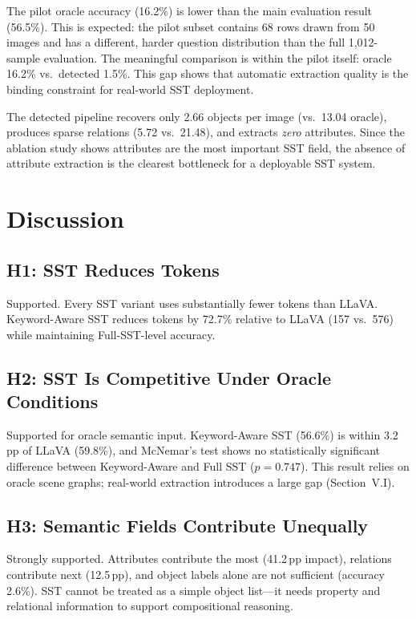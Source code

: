 \documentclass[10pt,twocolumn]{article}
\begin{document}
The pilot oracle accuracy (16.2\%) is lower than the main evaluation result (56.5\%). This is expected: the pilot subset contains 68 rows drawn from 50 images and has a different, harder question distribution than the full 1,012-sample evaluation. The meaningful comparison is within the pilot itself: oracle 16.2\% vs.\ detected 1.5\%. This gap shows that automatic extraction quality is the binding constraint for real-world SST deployment.

The detected pipeline recovers only 2.66 objects per image (vs.\ 13.04 oracle), produces sparse relations (5.72 vs.\ 21.48), and extracts \emph{zero} attributes. Since the ablation study shows attributes are the most important SST field, the absence of attribute extraction is the clearest bottleneck for a deployable SST system.

\section{Discussion}

\subsection{H1: SST Reduces Tokens}

Supported. Every SST variant uses substantially fewer tokens than LLaVA. Keyword-Aware SST reduces tokens by 72.7\% relative to LLaVA (157 vs.\ 576) while maintaining Full-SST-level accuracy.

\subsection{H2: SST Is Competitive Under Oracle Conditions}

Supported for oracle semantic input. Keyword-Aware SST (56.6\%) is within 3.2\,pp of LLaVA (59.8\%), and McNemar's test shows no statistically significant difference between Keyword-Aware and Full SST ($p = 0.747$). This result relies on oracle scene graphs; real-world extraction introduces a large gap (Section~V.I).

\subsection{H3: Semantic Fields Contribute Unequally}

Strongly supported. Attributes contribute the most (41.2\,pp impact), relations contribute next (12.5\,pp), and object labels alone are not sufficient (accuracy 2.6\%). SST cannot be treated as a simple object list---it needs property and relational information to support compositional reasoning.
\end{document}
